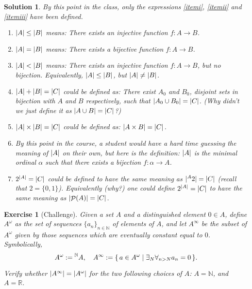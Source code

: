 \documentclass{article}
\newtheorem{ex}{Exercise}
\theoremstyle{nonumberplain}
\newtheorem{sol}{Solution}
\newcommand{\R}{\mathbb{R}}
\newcommand{\N}{\mathbb{N}}
\DeclarePairedDelimiter{\abs}{\lvert}{\rvert}
\DeclareMathOperator{\powerset}{\mathcal{P}}
\begin{document}
\begin{sol}
By this point in the class, only the expressions \ref{itemi}, \ref{itemii} and \ref{itemiii} have been defined.
\begin{enumerate}
\item $\abs{A} \leq \abs{B}$ means: There exists an injective function $f \colon A \to B$.
\item $\abs{A} = \abs{B}$ means: There exists a bijective function $f \colon A \to B$.
\item $\abs{A} < \abs{B}$ means: There exists an injective function $f \colon A \to B$, but no bijection. Equivalently, $\abs{A} \leq \abs{B}$, but $\abs{A} \neq \abs{B}$.
\item $\abs{A} + \abs{B} = \abs{C}$ could be defined as: There exist $A_0$ and $B_0$, disjoint sets in bijection with $A$ and $B$ respectively, such that $\abs{A_0 \cup B_0} = \abs{C}$. (Why didn't we just define it as $\abs{A \cup B} = \abs{C}$?)
\item $\abs{A} \times \abs{B} = \abs C$ could be defined as: $\abs{A \times B} = \abs{C}$.
\item By this point in the course, a student would have a hard time guessing the meaning of $\abs{A}$ on their own, but here is the definition: $\abs{A}$ is the minimal ordinal $\alpha$ such that there exists a bijection $f \colon \alpha \to A$.
\item $2^{\abs{A}} = \abs C$ could be defined to have the same meaning as $\abs{\prescript A {} 2} = \abs C$ (recall that $2 = \{0,1\}$). Equivalently (why?) one could define $2^{\abs{A}} = \abs C$ to have the same meaning as $\abs{\powerset(A)} = \abs C$.
\end{enumerate}
\end{sol}

\begin{ex}[Challenge]
Given a set $A$ and a distinguished element $0 \in A$, define $A^\omega$ as the set of sequences $\{a_n\}_{n \in \N}$ of elements of $A$, and let $A^\infty$ be the subset of $A^\omega$ given by those sequences which are eventually constant equal to $0$. Symbolically,
\begin{equation}
A^\omega := \prescript{\N}{}{A},\quad A^\infty := \{\, a \in A^\omega \mid \exists_N \forall_{n>N} a_n = 0 \,\}.
\end{equation}

Verify whether $\abs{A^\infty} = \abs{A^\omega}$ for the two following choices of $A$: $A = \N$, and $A = \R$.
\end{ex}
\end{document}
